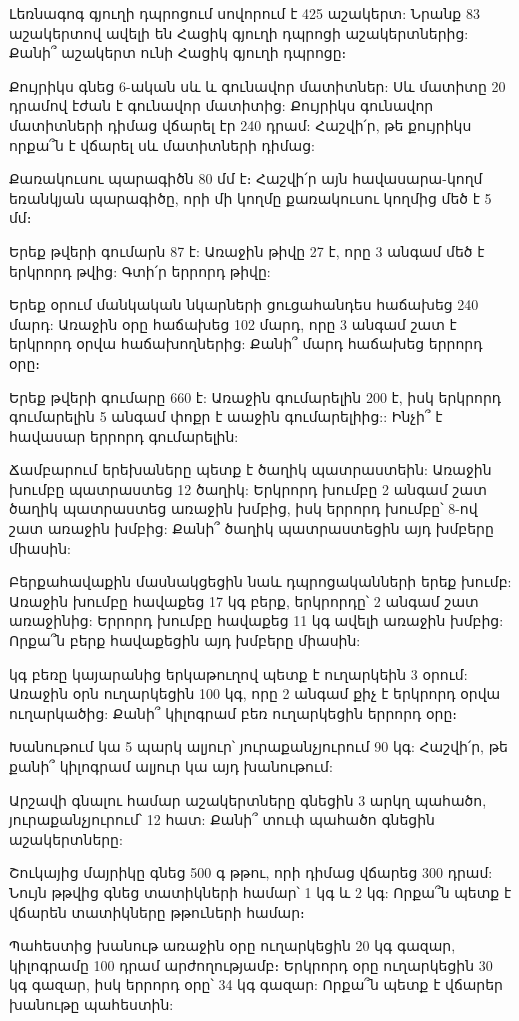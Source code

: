 \problem
Լեռնագոգ գյուղի դպրոցում սովորում է 425 աշակերտ: Նրանք 83 
աշակերտով ավելի են Հացիկ գյուղի դպրոցի աշակերտներից: Քանի՞ 
աշակերտ ունի Հացիկ գյուղի դպրոցը։

\problem
Քույրիկս գնեց 6-ական սև և գունավոր մատիտներ: Սև մատիտը 20 
դրամով էժան է գունավոր մատիտից: Քույրիկս գունավոր մատիտների 
դիմաց վճարել էր 240 դրամ: Հաշվի՛ր, թե քույրիկս որքա՞ն է վճարել 
սև մատիտների դիմաց:

\problem
Քառակուսու պարագիծն 80 մմ է։ Հաշվի՛ր այն հավասարա-կողմ եռանկյան 
պարագիծը, որի մի կողմը քառակուսու կողմից մեծ է 5 մմ։

\problem
Երեք թվերի գումարն 87 է: Առաջին թիվը 27 է, որը 3 անգամ մեծ է 
երկրորդ թվից: Գտի՛ր երրորդ թիվը:

\problem
Երեք օրում մանկական նկարների ցուցահանդես հաճախեց 240 մարդ: Առաջին 
օրը հաճախեց 102 մարդ, որը 3 անգամ շատ է երկրորդ օրվա հաճախողներից: 
Քանի՞ մարդ հաճախեց երրորդ օրը։

\problem
Երեք թվերի գումարը 660 է: Առաջին գումարելին 200 է, իսկ երկրորդ 
գումարելին 5 անգամ փոքր է աաջին գումարելիից:: Ինչի՞ է հավասար 
երրորդ գումարելին:

\problem
Ճամբարում երեխաները պետք է ծաղիկ պատրաստեին: Առաջին խումբը 
պատրաստեց 12 ծաղիկ: Երկրորդ խումբը 2 անգամ շատ ծաղիկ պատրաստեց 
առաջին խմբից, իսկ երրորդ խումբը՝ 8-ով շատ առաջին խմբից: Քանի՞ 
ծաղիկ պատրաստեցին այդ խմբերը միասին:

\problem
Բերքահավաքին մասնակցեցին նաև դպրոցականների երեք խումբ: Առաջին 
խումբը հավաքեց 17 կգ բերք, երկրորդը՝ 2 անգամ շատ առաջինից: Երրորդ 
խումբը հավաքեց 11 կգ ավելի առաջին խմբից: Որքա՞ն բերք հավաքեցին 
այդ խմբերը միասին:

 կգ բեռը կայարանից երկաթուղով պետք է ուղարկեին 3 օրում: Առաջին 
օրն ուղարկեցին 100 կգ, որը 2 անգամ քիչ է երկրորդ օրվա ուղարկածից: 
Քանի՞ կիլոգրամ բեռ ուղարկեցին երրորդ օրը։

\problem
Խանութում կա 5 պարկ ալյուր՝ յուրաքանչյուրում 90 կգ: Հաշվի՛ր, թե 
քանի՞ կիլոգրամ ալյուր կա այդ խանութում:

\problem
Արշավի գնալու համար աշակերտները գնեցին 3 արկղ պահածո, յուրաքանչյուրում՝ 
12 հատ: Քանի՞ տուփ պահածո գնեցին աշակերտները:

\problem
Շուկայից մայրիկը գնեց 500 գ թթու, որի դիմաց վճարեց 300 դրամ: Նույն 
թթվից գնեց տատիկների համար՝ 1 կգ և 2 կգ: Որքա՞ն պետք է վճարեն 
տատիկները թթուների համար։

\problem
Պահեստից խանութ առաջին օրը ուղարկեցին 20 կգ գազար, կիլոգրամը 100 
դրամ արժողությամբ։ Երկրորդ օրը ուղարկեցին 30 կգ գազար, իսկ երրորդ 
օրը՝ 34 կգ գազար: Որքա՞ն պետք է վճարեր խանութը պահեստին:




\bye
